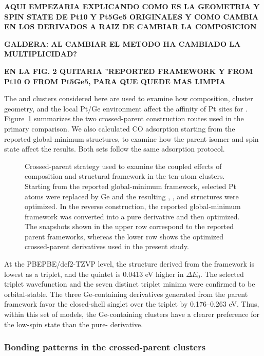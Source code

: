 
\textbf{AQUI EMPEZARIA EXPLICANDO COMO ES LA GEOMETRIA Y SPIN STATE DE Pt10 Y Pt5Ge5 ORIGINALES Y COMO CAMBIA EN LOS DERIVADOS A RAIZ DE CAMBIAR LA COMPOSICION}

\textbf{GALDERA: AL CAMBIAR EL METODO HA CAMBIADO LA MULTIPLICIDAD?}

\textbf{EN LA FIG. 2 QUITARIA "REPORTED FRAMEWORK Y FROM Pt10 O FROM Pt5Ge5, PARA QUE QUEDE MAS LIMPIA}

The  and  clusters considered here
are used to examine how composition, cluster geometry, and
the local Pt/Ge environment affect the affinity of Pt sites for .
{Figure~\ref{fig:crossed_models} summarizes the two crossed-parent
construction routes used in the primary comparison. We also calculated CO
adsorption starting from the reported global-minimum structures, to examine how
the parent isomer and spin state affect the results. Both sets follow the same
adsorption protocol.}

\begin{figure}[H]
\centering

\caption{Crossed-parent strategy used to examine the coupled effects of
composition and structural framework in the ten-atom clusters. Starting from
the reported global-minimum  framework, selected Pt atoms were
replaced by Ge and the resulting , , and 
structures were optimized. In the reverse construction, the reported
global-minimum  framework was converted into a pure 
derivative and then optimized. The snapshots
shown in the upper row correspond to the reported parent frameworks, whereas
the lower row shows the optimized crossed-parent derivatives used in the
present study.}
\label{fig:crossed_models}
\end{figure}

At the PBEPBE/def2-TZVP level, the  structure derived from the
 framework is lowest as a triplet, and the quintet is 0.0413 eV
higher in $\Delta E_0$. The selected triplet wavefunction and the seven
distinct triplet  minima were confirmed to be orbital-stable. The three
Ge-containing derivatives generated from the  parent framework favor
the closed-shell singlet over the triplet by 0.176--0.263 eV. Thus, within this
set of models, the Ge-containing clusters have a clearer preference for
the low-spin state than the pure- derivative.

\subsubsection{Bonding patterns in the crossed-parent clusters}

